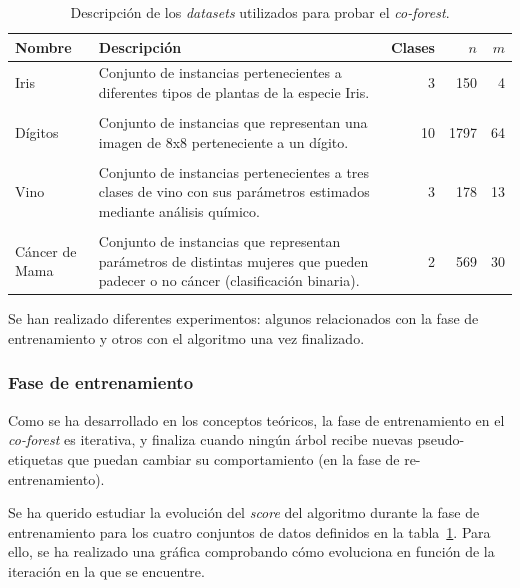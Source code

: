 \begin{table}
	\small
	\begin{centering}
		
		\begin{tabular}{@{}p{4em} p{20em} r r r @{}}
			\toprule
			\textbf{Nombre} & \textbf{Descripción} & \textbf{Clases} & $n$ & $m$\\ 
			\midrule
			
			Iris & Conjunto de instancias pertenecientes a diferentes tipos de plantas de la especie Iris. & 3 & 150 & 4 \\\\
			Dígitos & Conjunto de instancias que representan una imagen de 8x8 perteneciente a un dígito. & 10 & 1797 & 64 \\\\
			Vino & Conjunto de instancias pertenecientes a tres clases de vino con sus parámetros estimados mediante análisis químico. & 3 & 178 & 13 \\\\
			Cáncer de Mama & Conjunto de instancias que representan parámetros de distintas mujeres que pueden padecer o no cáncer (clasificación binaria). & 2 & 569 & 30 \\
			
			\bottomrule
			
		\end{tabular}
		
	\end{centering}
	\caption{Descripción de los \textit{datasets} utilizados para probar el \textit{co-forest}.}
	\label{tabla_datasets_sklearn}	
\end{table}


Se han realizado diferentes experimentos: algunos relacionados con la fase de entrenamiento y otros con el algoritmo una vez finalizado.

\subsubsection{Fase de entrenamiento}

Como se ha desarrollado en los conceptos teóricos, la fase de entrenamiento en el \textit{co-forest} es iterativa, y finaliza cuando ningún árbol recibe nuevas pseudo-etiquetas que puedan cambiar su comportamiento (en la fase de re-entrenamiento).

Se ha querido estudiar la evolución del \textit{score} del algoritmo durante la fase de entrenamiento para los cuatro conjuntos de datos definidos en la tabla~\ref{tabla_datasets_sklearn}. Para ello, se ha realizado una gráfica comprobando cómo evoluciona en función de la iteración en la que se encuentre.

